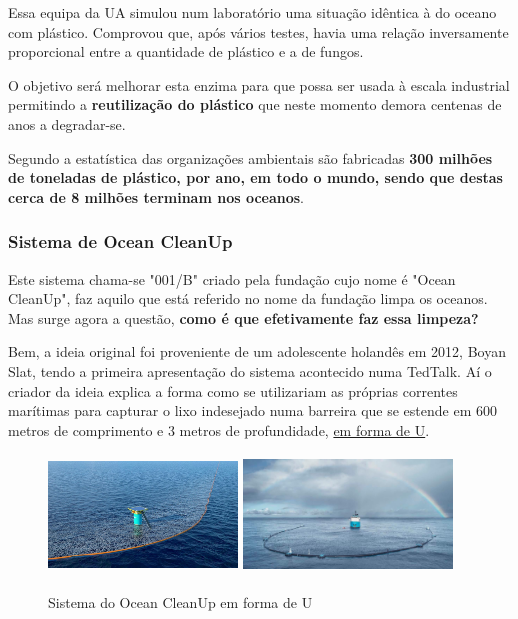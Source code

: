 \documentclass[letterpaper,12pt]{article}
\begin{document}
\par Essa equipa da UA simulou num laboratório uma situação idêntica à do oceano com plástico. Comprovou que, após vários testes, havia uma relação inversamente proporcional entre a quantidade de plástico e a de fungos.
\par O objetivo será melhorar esta enzima para que possa ser usada à escala industrial permitindo a {\bf reutilização do plástico} que neste momento demora centenas de anos a degradar-se.
\par Segundo a estatística das organizações ambientais são fabricadas {\bf 300 milhões de toneladas de plástico, por ano, em todo o mundo, sendo que destas cerca de 8 milhões terminam nos oceanos}.
\newpage
\subsubsection{Sistema de Ocean CleanUp}
\par \citep{n_2019_mquina}Este sistema chama-se "001/B" criado pela fundação cujo nome é "Ocean CleanUp", faz aquilo que está referido no nome da fundação limpa os oceanos. Mas surge agora a questão, {\bf como é que efetivamente faz essa limpeza?}
\par Bem, a ideia original foi proveniente de um adolescente holandês em 2012, Boyan Slat, tendo a primeira apresentação do sistema acontecido numa TedTalk. Aí o criador da ideia explica a forma como se utilizariam as próprias correntes marítimas para capturar o lixo indesejado numa barreira que se estende em 600 metros de comprimento e 3 metros de profundidade, \underline{em forma de U}.
\begin{figure}[h]
    \centering
    \includegraphics[width = 190px, height = 120px]{OCup1.jpg}
    \includegraphics[width = 210px, height = 120px]{OCUp.jpg}
    \caption{Sistema do Ocean CleanUp em forma de U}
    \label{fig:OC}
\end{figure}
\end{document}

